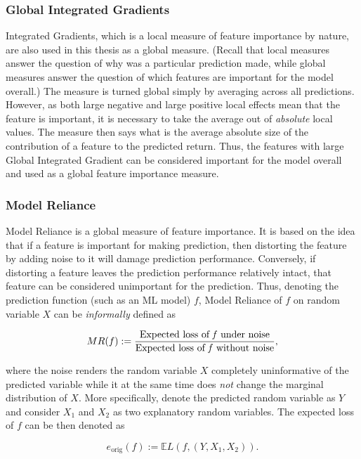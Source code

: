 		\subsubsection{Global Integrated Gradients}
			Integrated Gradients, which is a local measure of feature importance by nature, are also used in this thesis as a global measure. (Recall that local measures answer the question of why was a particular prediction made, while global measures answer the question of which features are important for the model overall.) The measure is turned global simply by averaging across all predictions. However, as both large negative and large positive local effects mean that the feature is important, it is necessary to take the average out of \textit{absolute} local values. The measure then says what is the average absolute size of the contribution of a feature to the predicted return. Thus, the features with large Global Integrated Gradient can be considered important for the model overall and used as a global feature importance measure.  
			
		
		\subsubsection{Model Reliance}
			Model Reliance \citep{fisher2019all} is a global measure of feature importance. It is based on the idea that if a feature is important for making prediction, then distorting the feature by adding noise to it will damage prediction performance. Conversely, if distorting a feature leaves the prediction performance relatively intact, that feature can be considered unimportant for the prediction. Thus, denoting  the prediction function (such as an ML model) $f$, Model Reliance of  $f$ on random variable $X$ can be \textit{informally} defined as
			
			\begin{equation*}
				MR(f):=\frac{\text{Expected loss of \textit{f} under noise}}{\text{Expected loss of \textit{f} without noise}},
			\end{equation*}
			
			where the noise renders the random variable $X$ completely uninformative of the predicted variable while it at the same time does \textit{not} change the marginal distribution of $X$. More specifically, denote the predicted random variable as $Y$ and consider $X_1$ and $X_2$ as two explanatory random variables. The expected loss of $f$ can be then denoted as 
			
			\begin{equation*}
				e_{\text{orig}}(f):= \mathbb{E} L(f,(Y,X_1, X_2)).
			\end{equation*} 
			
